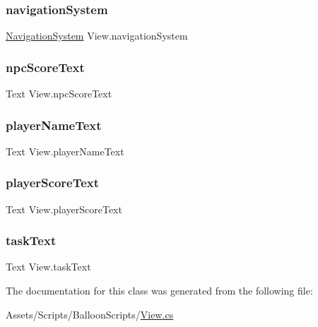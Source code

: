 \mbox{\label{classView_a983ba5bf73850b60e7a45b50c7a1d776}} 
\subsubsection{\texorpdfstring{navigation\+System}{navigationSystem}}
{\footnotesize\ttfamily \hyperlink{classNavigationSystem}{Navigation\+System} View.\+navigation\+System}

\mbox{\label{classView_a824504d7a36642711e793df9b5de12b6}} 
\subsubsection{\texorpdfstring{npc\+Score\+Text}{npcScoreText}}
{\footnotesize\ttfamily Text View.\+npc\+Score\+Text}

\mbox{\label{classView_aef06655ff7a3a1af1fa1df035e147324}} 
\subsubsection{\texorpdfstring{player\+Name\+Text}{playerNameText}}
{\footnotesize\ttfamily Text View.\+player\+Name\+Text}

\mbox{\label{classView_a9743e2966354094f2078593bc04c64e3}} 
\subsubsection{\texorpdfstring{player\+Score\+Text}{playerScoreText}}
{\footnotesize\ttfamily Text View.\+player\+Score\+Text}

\mbox{\label{classView_a046ed9689af065a613d9bc169952b6ea}} 
\subsubsection{\texorpdfstring{task\+Text}{taskText}}
{\footnotesize\ttfamily Text View.\+task\+Text}



The documentation for this class was generated from the following file\+:\begin{DoxyCompactItemize}
\item 
Assets/\+Scripts/\+Balloon\+Scripts/\hyperlink{View_8cs}{View.\+cs}\end{DoxyCompactItemize}
